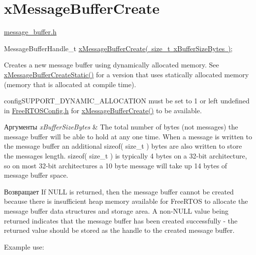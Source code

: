 \hypertarget{group__x_message_buffer_create}{}\section{x\+Message\+Buffer\+Create}
\label{group__x_message_buffer_create}
\mbox{\hyperlink{message__buffer_8h}{message\+\_\+buffer.\+h}}


\begin{DoxyPre}
MessageBufferHandle\_t \mbox{\hyperlink{message__buffer_8h_a2959cd0e3d2bd20d46908e5c9872be36}{xMessageBufferCreate( size\_t xBufferSizeBytes )}};
\end{DoxyPre}


Creates a new message buffer using dynamically allocated memory. See \mbox{\hyperlink{message__buffer_8h_acc84f4a15dbd39ecbad35f7337e78b2c}{x\+Message\+Buffer\+Create\+Static()}} for a version that uses statically allocated memory (memory that is allocated at compile time).

config\+S\+U\+P\+P\+O\+R\+T\+\_\+\+D\+Y\+N\+A\+M\+I\+C\+\_\+\+A\+L\+L\+O\+C\+A\+T\+I\+ON must be set to 1 or left undefined in \mbox{\hyperlink{_free_r_t_o_s_config_8h}{Free\+R\+T\+O\+S\+Config.\+h}} for \mbox{\hyperlink{message__buffer_8h_a2959cd0e3d2bd20d46908e5c9872be36}{x\+Message\+Buffer\+Create()}} to be available.


\begin{DoxyParams}{Аргументы}
{\em x\+Buffer\+Size\+Bytes} & The total number of bytes (not messages) the message buffer will be able to hold at any one time. When a message is written to the message buffer an additional sizeof( size\+\_\+t ) bytes are also written to store the message\textquotesingle{}s length. sizeof( size\+\_\+t ) is typically 4 bytes on a 32-\/bit architecture, so on most 32-\/bit architectures a 10 byte message will take up 14 bytes of message buffer space.\\
\hline
\end{DoxyParams}
\begin{DoxyReturn}{Возвращает}
If N\+U\+LL is returned, then the message buffer cannot be created because there is insufficient heap memory available for Free\+R\+T\+OS to allocate the message buffer data structures and storage area. A non-\/\+N\+U\+LL value being returned indicates that the message buffer has been created successfully -\/ the returned value should be stored as the handle to the created message buffer.
\end{DoxyReturn}
Example use\+: 
\begin{DoxyPre}\end{DoxyPre}



